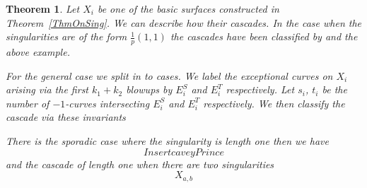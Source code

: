 \documentclass[12pt]{amsbook}
\theoremstyle{plain}
\newtheorem{thm}{Theorem}[section]
\begin{document}
\begin{thm}
Let $X_i$ be one of the basic surfaces constructed in Theorem~\ref{ThmOnSing}. We can describe how their cascades. In the case when the singularities are of the form $\frac{1}{p}(1,1)$ the cascades have been classified by \cite{CP} and the above example. 

For the general case we split in to cases. We label the exceptional curves on $X_i$ arising via the first $k_1+k_2$ blowups by $E_i^S$ and $E_i^T$ respectively. Let $s_i$, $t_i$ be the number of $-1$-curves intersecting $E_i^S$ and $E_i^T$ respectively. We then classify the cascade via these invariants


There is the sporadic case where the singularity is length one then we have 
\[
Insert cavey Prince
\]
and the cascade of length one when there are two singularities
\[
X_{a,b}
\]


\end{thm}
\end{document}
